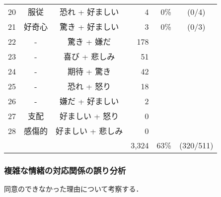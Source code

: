 \documentclass[japanese]{jnlp_1.3c}
\begin{document}
\begin{table}[t]
\begin{center}
\begin{tabular}{rccrrc}
20&服従     &恐れ + 好ましい&4    &0\%    &(0/4)\\
21&好奇心   &驚き + 好ましい&3    &0\%    &(0/3)\\
22&-        &驚き + 嫌だ    &178  &      &\\
23&-        &喜び + 悲しみ  &51   &      &\\
24&-        &期待 + 驚き    &42   &      &\\
25&-        &恐れ + 怒り    &18   &      &\\
26&-        &嫌だ + 好ましい&2    &      &\\
27&支配     &好ましい + 怒り&0    &      &\\
28&感傷的   &好ましい + 悲しみ&0    &      &\\
\hline
  &         &               &3,324 &63\%   &(320/511)\\
\hline
\end{tabular}
\end{center}
\end{table}


\subsubsection{複雑な情緒の対応関係の誤り分析}

同意のできなかった理由について考察する．
\end{document}
